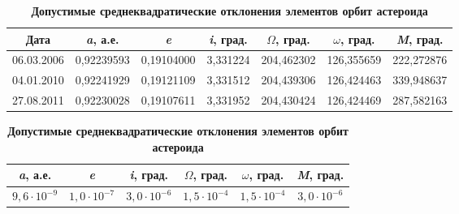 \begin{table}[!t] \footnotesize
	\center
	\caption{\bf Элементы орбит астероида на различные даты наблюдений}\vspace{-3mm}
	\label{derev:tablElemOrb}

\begin{tabular}{c|c|c|c|c|c|c}
\hline 
\scriptsize
Дата & 
\scriptsize 
\emph{a}, а.е. & 
\scriptsize
\emph{e} & 
\scriptsize
\emph{i}, град. & 
\scriptsize
$\Omega$, град. & 
\scriptsize
$\omega$, град. & 
\scriptsize
\emph{M}, град. \\
\hline
\rule{0mm}{12pt}%
06.03.2006 & 0,92239593 & 0,19104000 & 3,331224 & 204,462302 & 126,355659 & 222,272876 \\
04.01.2010 & 0,92241929 & 0,19121109 & 3,331512 & 204,439306 & 126,424463 & 339,948637 \\
27.08.2011 & 0,92230028 & 0,19107611 & 3,331952 & 204,430424 & 126,424469 & 287,582163 \\
\hline
\end{tabular}

\medskip
\medskip
\setlength{\tabcolsep}{13pt}
\caption{\bf Допустимые среднеквадратические отклонения элементов орбит астероида}\vspace{-3mm}
	\label{derev:tablSigmaElem}
\begin{tabular}[h]{*{5}{c|}c}
			\hline
\scriptsize 
\emph{a}, а.е. & 
\scriptsize
\emph{e} & 
\scriptsize
\emph{i}, град. & 
\scriptsize
$\Omega$, град. & 
\scriptsize
$\omega$, град. & 
\scriptsize
\emph{M}, град. \\
\hline
\rule{0mm}{12pt}%
$ 9,6 \cdot 10^{-9}$&$1,0 \cdot 10^{-7}$&$ 3,0 \cdot 10^{-6}$&$1,5 \cdot 10^{-4}$&$ 1,5 \cdot 10^{-4}$&$ 3,0 \cdot 10^{-6}$\\
			\hline
			\end{tabular}
			\vspace{-3mm}
\end{table}

